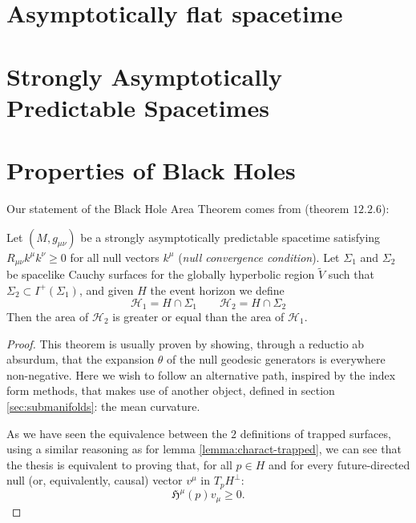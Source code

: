 \section{Asymptotically flat spacetime}

\section{Strongly Asymptotically Predictable Spacetimes}

\section{Properties of Black Holes}


Our statement of the Black Hole Area Theorem comes from \cite{wald2010general} (theorem \(12.2.6\)):
\begin{theorem}
	Let \((M, g_{\mu\nu})\) be a strongly asymptotically predictable spacetime satisfying \(R_{\mu\nu}k^{\mu}k^{\nu} \ge 0\) for all null vectors \(k^{\mu}\) (\emph{null convergence condition}). Let \(\Sigma_1\) and \(\Sigma_2\) be spacelike Cauchy surfaces for the globally hyperbolic region \(\tilde{V}\) such that \(\Sigma_2 \subset I^+(\Sigma_1)\), and given \(H\) the event horizon we define
	\[
	\mathcal{H}_1 = H \cap \Sigma_1 \quad \quad \mathcal{H}_2 = H \cap \Sigma_2
	\]
	Then the area of \(\mathcal{H}_2\) is greater or equal than the area of \(\mathcal{H}_1\).
\end{theorem}

\begin{proof}
	This theorem is usually proven by showing, through a reductio ab absurdum, that the expansion \(\theta\) of the null geodesic generators is everywhere non-negative. Here we wish to follow an alternative path, inspired by the index form methods, that makes use of another object, defined in section \ref{sec:submanifolds}: the mean curvature.
	
	As we have seen the equivalence between the \(2\) definitions of trapped surfaces, %
	using a similar reasoning as for lemma \ref{lemma:charact-trapped}, we can see that the thesis is equivalent to proving that, for all \(p \in H\) and for every future-directed null (or, equivalently, causal) vector \(v^{\mu}\) in \(T_pH^{\perp}\):
	\[
	\mathfrak{H}^{\mu}(p)v_{\mu} \ge 0.
	\]
	
\end{proof}